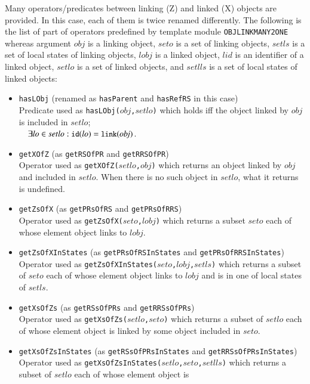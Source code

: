\documentclass[12pt]{report}
\newcommand{\mbstt}[1]{\mbox{\small{\tt {#1}}}}
\newcommand{\stt}[1]{{\small{\tt {#1}}}}
\begin{document}
Many operators/predicates between linking (Z) and linked (X) objects
are provided. In this case, each of them is twice renamed differently.
The following is the list of part of operators predefined by template
module {\tt OBJLINKMANY2ONE} whereas argument $\mathit{obj}$ is a linking
object, $seto$ is a set of linking objects, $setls$ is a set of local
states of linking objects, $\mathit{lobj}$ is a linked object, $lid$ is an
identifier of a linked object, $setlo$ is a set of linked objects, and
$setlls$ is a set of local states of linked objects:
\begin{itemize}
\item \stt{hasLObj} (renamed as \stt{hasParent} and \stt{hasRefRS} in this case)\\
  Predicate used as \stt{hasLObj($\mathit{obj}$,$setlo$)} which holds iff
  the object linked by $\mathit{obj}$ is included in $setlo$;\\$~~~~\exists lo\in
  setlo:\mbstt{id}(lo)=\mbstt{link}(\mathit{obj})$.
\item \stt{getXOfZ} (as \stt{getRSOfPR} and \stt{getRRSOfPR})\\
  Operator used as \stt{getXOfZ($setlo$,$\mathit{obj}$)} which returns an
  object linked by $\mathit{obj}$ and included in $setlo$. When there is no such
  object in $setlo$, what it returns is undefined.
\item \stt{getZsOfX} (as \stt{getPRsOfRS} and \stt{getPRsOfRRS})\\
  Operator used as \stt{getZsOfX($seto$,$\mathit{lobj}$)} which returns a subset
  $seto$ each of whose element object links to $\mathit{lobj}$.
\item \stt{getZsOfXInStates} (as \stt{getPRsOfRSInStates} and \stt{getPRsOfRRSInStates})\\
  Operator used as \stt{getZsOfXInStates($seto$,$\mathit{lobj}$,$setls$)} which
  returns a subset of $seto$ each of whose element object links to
  $\mathit{lobj}$ and is in one of local states of $setls$.
\item \stt{getXsOfZs} (as \stt{getRSsOfPRs} and \stt{getRRSsOfPRs})\\
  Operator used as \stt{getXsOfZs($setlo$,$seto$)} which returns a
  subset of $setlo$ each of whose element object is linked by some
  object included in $seto$.
\item \stt{getXsOfZsInStates} (as \stt{getRSsOfPRsInStates} and \stt{getRRSsOfPRsInStates})\\
  Operator used as \stt{getXsOfZsInStates($setlo$,$seto$,$setlls$)}
  which returns a subset of $setlo$ each of whose element object is

\end{itemize}
\end{document}
